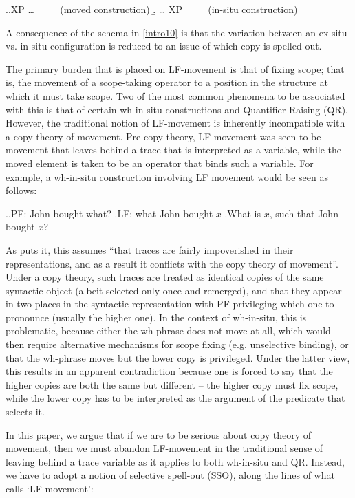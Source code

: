 \documentclass{glossa}
\begin{document}
\ex.\label{intro10}\a.XP {\dots}  $\qquad$ (moved construction)
    \b. {\dots} XP $\qquad$ (in-situ construction)

A consequence of the schema in \ref{intro10} is that the variation between an ex-situ vs. in-situ configuration is reduced to an issue of which copy is spelled out.

The primary burden that is placed on LF-movement is that of fixing scope; that is, the movement of a scope-taking operator to a position in the structure at which it must take scope. Two of the most common phenomena to be associated with this is that of certain wh-in-situ constructions and Quantifier Raising (QR). However, the traditional notion of LF-movement is inherently incompatible with a copy theory of movement. Pre-copy theory, LF-movement was seen to be movement that leaves behind a trace that is interpreted as a variable, while the moved element is taken to be an operator that binds such a variable. For example, a wh-in-situ construction involving LF movement would be seen as follows:

\ex.\label{intro20}\a.PF: John bought what?
   \b.LF: what John bought $x$
   \b.What is $x$, such that John bought $x$?

As \cite{fox:2002} puts it, this assumes ``that traces are fairly impoverished in their representations, and as a result it conflicts with the copy theory of movement''. Under a copy theory, such traces are treated as identical copies of the same syntactic object (albeit selected only once and remerged), and that they appear in two places in the syntactic representation with PF privileging which one to pronounce (usually the higher one). In the context of wh-in-situ, this is problematic, because either the wh-phrase does not move at all, which would then require alternative mechanisms for scope fixing (e.g. unselective binding), or that the wh-phrase moves but the lower copy is privileged. Under the latter view, this results in an apparent contradiction because one is forced to say that the higher copies are both the same but different -- the higher copy must fix scope, while the lower copy has to be interpreted as the argument of the predicate that selects it.

In this paper, we argue that if we are to be serious about copy theory of movement, then we must abandon LF-movement in the traditional sense of leaving behind a trace variable as it applies to both wh-in-situ and QR. Instead, we have to adopt a notion of selective spell-out (SSO), along the lines of what \cite{bobaljik:2002} calls `LF movement':
\end{document}
